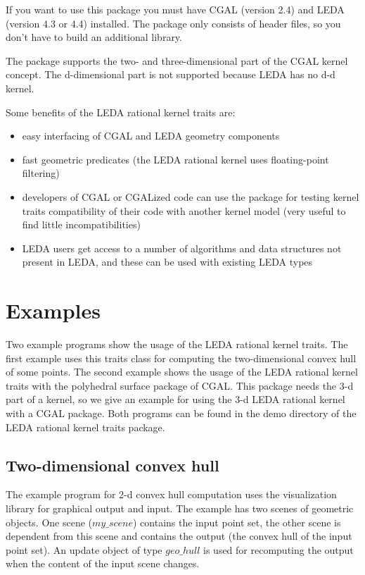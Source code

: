 If you want to use this package you must have CGAL (version 2.4) and LEDA (version 4.3 or 4.4) 
installed. The package only consists of header files, so you don't have to build an additional
library.

The package supports the two- and three-dimensional part of the CGAL kernel concept. The d-dimensional
part is not supported because LEDA has no d-d kernel.

Some benefits of the LEDA rational kernel traits are:
\begin{itemize}
\item easy interfacing of CGAL and LEDA geometry components
\item fast geometric predicates (the LEDA rational kernel uses floating-point filtering)
\item developers of CGAL or CGALized code can use the package for testing kernel traits compatibility of
      their code with another kernel model (very useful to find little incompatibilities)
\item LEDA users get access to a number of algorithms and data structures not present in LEDA, and these
      can be used with existing LEDA types
\end{itemize}


\section{Examples}

Two example programs show the usage of the LEDA rational kernel traits. The first example uses this traits
class for computing the two-dimensional convex hull of some points. The second example shows  the usage
of the LEDA rational kernel traits with the polyhedral surface package of CGAL. This package needs the 3-d
part of a kernel, so we give an example for using the 3-d LEDA rational kernel with a CGAL package.
Both programs can be found in the demo directory of the LEDA rational kernel traits package.

\subsection{Two-dimensional convex hull}

The example program for 2-d convex hull computation uses the  visualization library for
graphical output and input. 
The example has two scenes of geometric objects. One scene ($my\_scene$) contains the input point set, the other
scene is dependent from this scene and contains the output (the convex hull of the input point set).
An update object of type $geo\_hull$ is used for recomputing the output when the content of the input scene
changes.
\ccHtmlLinksOff

